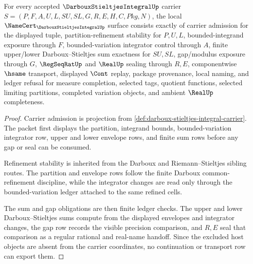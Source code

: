 \begin{theorem}
\label{thm:darboux-stieltjes-integral-namecert-obligations}
For every accepted $\DarbouxStieltjesIntegralUp$ carrier $S=(P,F,A,U,L,SU,SL,G,R,E,H,C,Pkg,N)$, the local $\NameCert_{\DarbouxStieltjesIntegralUp}$ surface consists exactly of carrier admission for the displayed tuple, partition-refinement stability for $P,U,L$, bounded-integrand exposure through $F$, bounded-variation integrator control through $A$, finite upper/lower Darboux--Stieltjes sum exactness for $SU,SL$, gap/modulus exposure through $G$, $\RegSeqRatUp$ and $\RealUp$ sealing through $R,E$, componentwise $\hsame$ transport, displayed $\Cont$ replay, package provenance, local naming, and ledger refusal for measure completion, selected tags, quotient functions, selected limiting partitions, completed variation objects, and ambient $\RealUp$ completeness.
\end{theorem}
\begin{proof}
Carrier admission is projection from \autoref{def:darboux-stieltjes-integral-carrier}. The packet first displays the partition, integrand bounds, bounded-variation integrator row, upper and lower envelope rows, and finite sum rows before any gap or seal can be consumed.

Refinement stability is inherited from the Darboux and Riemann--Stieltjes sibling routes. The partition and envelope rows follow the finite Darboux common-refinement discipline, while the integrator changes are read only through the bounded-variation ledger attached to the same refined cells.

The sum and gap obligations are then finite ledger checks. The upper and lower Darboux--Stieltjes sums compute from the displayed envelopes and integrator changes, the gap row records the visible precision comparison, and $R,E$ seal that comparison as a regular rational and real-name handoff. Since the excluded host objects are absent from the carrier coordinates, no continuation or transport row can export them.
\end{proof}

